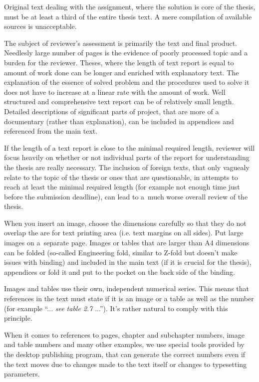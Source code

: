 Original text dealing with the assignment, where the solution is core of the thesis, must be at least a third of the entire thesis text. A mere compilation of available sources is unacceptable.

The subject of reviewer's assessment is primarily the text and final product.
Needlesly large number of pages is the evidence of poorly processed topic and a burden for the reviewer. Theses, where the length of text report is equal to amount of work done can be longer and enriched with explanatory text. The explanation of the essence of solved problem and the procedures used to solve it does not have to increase at a linear rate with the amount of work. Well structured and comprehensive text report can be of relatively small length. Detailed descriptions of significant parts of project, that are more of a documentary (rather than explanation), can be included in appendices and referenced from the main text.

If the length of a text report is close to the minimal required length, reviewer will focus heavily on whether or not individual parts of the report for understanding the thesis are really necessary. The inclusion of foreign texts, that only vaguealy relate to the topic of the thesis or ones that are questionable, in attempts to reach at least the minimal required length (for example not enough time just before the submission deadline), can lead to a~much worse overall review of the thesis.

When you insert an image, choose the dimensions carefully so that they do not overlap the are for text printing area (i.e. text margins on all sides). Put large images on a~separate page. Images or tables that are larger than A4 dimensions can be folded (so-called Engineering fold, similar to Z-fold but doesn't make issues with binding) and included in the main text (if it is crucial for the thesis), appendices or fold it and put to the pocket on the back side of the binding.

Images and tables use their own, independent numerical series. This means that references in the text must state if it is an image or a table as well as the number (for example ``... {\it see table 2.7} ...''). It's rather natural to comply with this principle.

When it comes to references to pages, chapter and subchapter numbers, image and table numbers and many other examples, we use special tools provided by the desktop publishing program, that can generate the correct numbers even if the text moves due to changes made to the text itself or changes to typesetting parameters.

